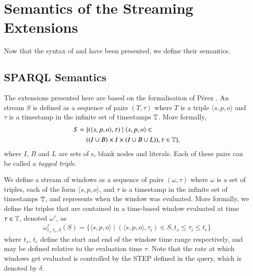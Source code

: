 \section{Semantics of the Streaming Extensions}
\label{semanticsstreaming}

Now that the syntax of \sparqlstr and \stwoo have been presented, we define their semantics.

\subsection{SPARQL Semantics}
\label{sparqlstrsemantics}

The \sparql extensions presented here are based on the formalisation of %
P\'erez \etal \cite{Perez_09}.
An \rdf stream $S$ is defined as a sequence of pairs $(T,\tau)$ where $T$ is a triple  $\langle s,p,o \rangle$ and $\tau$ is a timestamp in the infinite set of timestamps $\mathbb{T}$.
More formally, 
\begin{align*}
S =\;& \{( \langle s,p,o \rangle, \tau) \mid \langle s,p,o \rangle \in \\
     & ((I \cup B) \times I \times (I \cup B \cup L)  ), \tau \in \mathbb{T}\},
\end{align*}
where $I$, $B$ and $L$ are sets of \iri \!\!s, blank nodes and literals. 
Each of these pairs can be called a \emph{tagged triple}.

We define a stream of windows as a sequence of pairs $(\omega, \tau)$ where $\omega$ is a set of triples, each of the form $\langle s, p, o \rangle$, and $\tau$ is a timestamp in the infinite set of timestamps $\mathbb{T}$, and represents when the window was evaluated.
More formally, we define the triples that are contained in a time-based window evaluated at time $\tau \in \mathbb{T}$, denoted $\omega^{\tau}$, as
\begin{align*}
  \omega^{\tau}_{t_{s},t_{e},\delta}(S)=\{ \langle s,p,o \rangle \mid (\langle s,p,o \rangle, \tau_i) \in S, t_{s} \leq \tau_i \leq t_{e}\}
\end{align*}
where $t_s$, $t_e$ define the start and end of the window time range respectively, and may be defined relative to the evaluation time $\tau$. 
Note that the rate at which windows get evaluated is controlled by the \textsf{\small{STEP}} defined in the query, which is denoted by $\delta$.%

